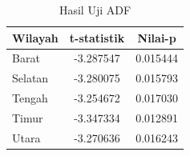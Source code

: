\begin{table}[H]
    \centering
    \caption{Hasil Uji ADF}
    \label{table:hasil-uji-adf}
    \begin{tabular}{lcc}
        \toprule
        \textbf{Wilayah} & \textbf{t-statistik} & \textbf{Nilai-p} \\
        \midrule
        Barat   & -3.287547 & 0.015444 \\
        Selatan & -3.280075 & 0.015793 \\
        Tengah  & -3.254672 & 0.017030 \\
        Timur   & -3.347334 & 0.012891 \\
        Utara   & -3.270636 & 0.016243 \\
        \bottomrule
    \end{tabular}
\end{table}
